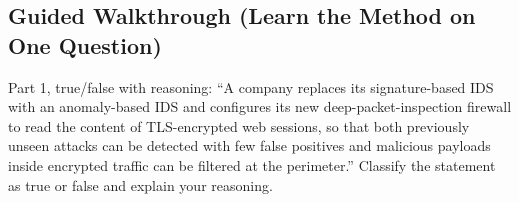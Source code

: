 \documentclass[12pt, a4paper]{article}
\begin{document}
\subsection*{Guided Walkthrough (Learn the Method on One Question)}

\begin{problembox}
Part 1, true/false with reasoning: ``A company replaces its signature-based IDS with an anomaly-based IDS and configures its new deep-packet-inspection firewall to read the content of TLS-encrypted web sessions, so that both previously unseen attacks can be detected with few false positives and malicious payloads inside encrypted traffic can be filtered at the perimeter.'' Classify the statement as true or false and explain your reasoning.
\end{problembox}
\end{document}
